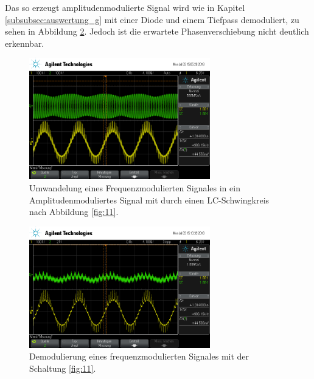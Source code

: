 Das so erzeugt amplitudenmodulierte Signal wird wie in Kapitel \ref{subsubsec:auswertung_g}
mit einer Diode und einem Tiefpass demoduliert, zu sehen in Abbildung \ref{fig:demod_frequenz}.
Jedoch ist die erwartete Phasenverschiebung nicht deutlich erkennbar.


\begin{figure}
  \centering
  \includegraphics[width=0.7\textwidth]{osci/freq_demod_amp.png}
  \caption{Umwandelung eines Frequenzmodulierten Signales in ein Amplitudenmoduliertes
Signal mit durch einen LC-Schwingkreis nach Abbildung \ref{fig:11}.}
\label{fig:freq_zu_amp}
\end{figure}



\begin{figure}
  \centering
  \includegraphics[width=0.7\textwidth]{osci/freq_demod.png}
  \caption{Demodulierung eines frequenzmodulierten Signales
  mit der Schaltung \ref{fig:11}.}
\label{fig:demod_frequenz}
\end{figure}
